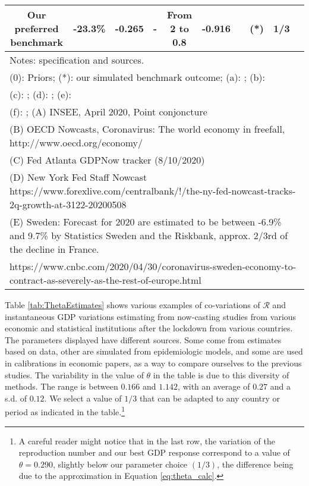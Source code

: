 \documentclass{amsart}
\begin{document}
\begin{table}[htbp]
\begin{tabular}{cccccccccc}
{\footnotesize{}Our preferred benchmark} & {\footnotesize{}-23.3\%} & {\footnotesize{}-0.265} & {\footnotesize{}-} & {\footnotesize{}From 2 to 0.8} & {\footnotesize{}-0.916} &   & {\footnotesize{}(*)} & \textbf{{\footnotesize{}1/3 }} & \tabularnewline
\midrule
\hline\hline
\multicolumn{10}{l}{{\tiny{}Notes: specification and sources.}}\tabularnewline
\multicolumn{10}{l}{{\tiny{}(0): Priors; (*): our simulated benchmark outcome; }  {\tiny{}(a): }{\tiny{}\cite{bryant2020estimating}}; {\tiny{}(b): }{\tiny{}\cite{dimdorel}}}
\tabularnewline
\multicolumn{10}{l}{{\tiny{}(c): }{\tiny{}\cite{hamouda2020schatzung}}; {\tiny{}(d): \cite{eichenbaum2020macroeconomics} }; {\tiny{}(e): }{\tiny{}\cite{riou2020pattern}}   }\tabularnewline
\multicolumn{10}{l}{{\tiny{}(f): }{\tiny{}\cite{jones2020optimal}}; {\tiny{}(A) INSEE, April 2020, Point conjoncture}}\tabularnewline
\multicolumn{10}{l}{{\tiny{}(B) OECD Nowcasts, Coronavirus: The world
economy in freefall, http://www.oecd.org/economy/}}\tabularnewline
\multicolumn{10}{l}{{\tiny{}(C) Fed Atlanta GDPNow tracker (8/10/2020)}}\tabularnewline
\multicolumn{10}{l}{{\tiny{}(D) New York Fed Staff Nowcast https://www.forexlive.com/centralbank/!/the-ny-fed-nowcast-tracks-2q-growth-at-3122-20200508 }}\tabularnewline
\multicolumn{10}{l}{{\tiny{}(E) Sweden: Forecast for 2020 are estimated to
be between -6.9\% and 9.7\% by Statistics Sweden and the Riskbank,
approx. 2/3rd of the decline in France. }}\tabularnewline
\multicolumn{10}{l}{{\tiny{}https://www.cnbc.com/2020/04/30/coronavirus-sweden-economy-to-contract-as-severely-as-the-rest-of-europe.html}}\tabularnewline
\hline
\end{tabular}
\end{table}

\vspace{0.4cm}


Table \ref{tab:ThetaEstimates} shows various examples of co-variations of $\mathcal{R}$ and instantaneous GDP variations estimating from now-casting studies from various economic and statistical institutions after the lockdown from various countries. The parameters displayed have different sources. Some come from estimates based on data, other are simulated from epidemiologic models, and some are used in calibrations in economic papers, as a way to compare ourselves to the previous studies. The variability in the value of $\theta$ in the table is due to this diversity of methods. The range is between $0.166$ and $1.142$, with an average of $0.27$ and a s.d. of $0.12$. We select a value of $1/3$ that can be adapted to any country or period as indicated in the table.\footnote{A careful reader might notice that in the last row, the variation of the reproduction number and our best GDP response correspond to a value of $\theta=0.290$, slightly below our parameter choice $(1/3)$, the difference being due to the approximation in Equation \ref{eq:theta_calc}.}
\end{document}
